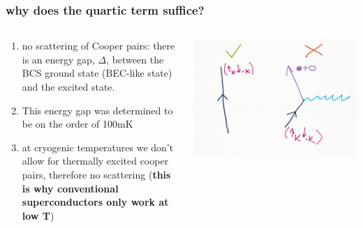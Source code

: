 \documentclass{beamer}
\begin{document}

\begin{frame}
\frametitle{why does the quartic term suffice?}
\begin{columns}[T]
    \begin{column}{.5\textwidth}
     \begin{block}{}

\begin{enumerate}
\item{no scattering of Cooper pairs: there is an energy gap, $\Delta$, between the BCS ground state (BEC-like state) and the excited state.}
\item{This energy gap was determined to be on the order of 100mK}
\item{at cryogenic temperatures we don't allow for thermally excited cooper pairs, therefore no scattering (\textbf{this is why conventional superconductors only work at low T})}
\end{enumerate}
    \end{block}
    \end{column}
    \begin{column}{.5\textwidth}
    \begin{block}{}
    \includegraphics[width=\textwidth>]{sketch.png}
    \end{block}
    \end{column}
  \end{columns}

\end{frame}
\end{document}
